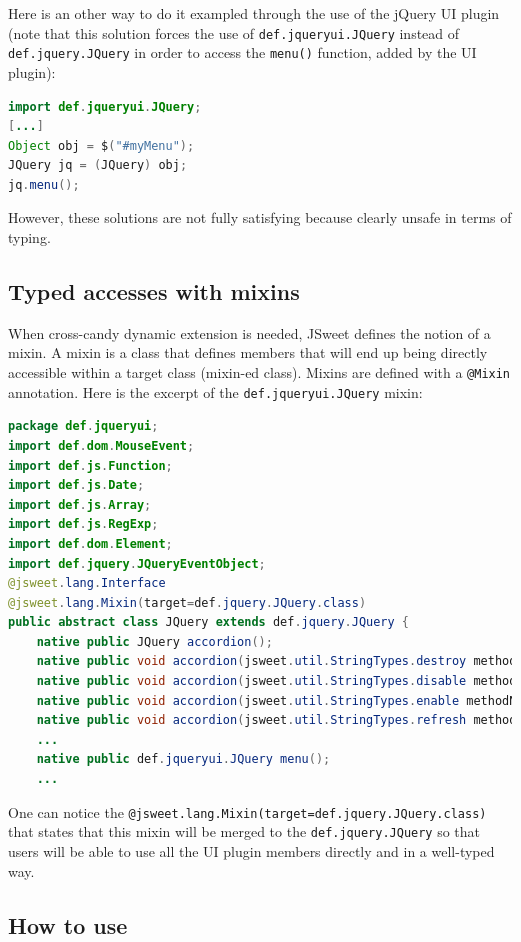 \documentclass[a4paper]{report}
\begin{document}
Here is an other way to do it exampled through the use of the jQuery UI plugin (note that this solution forces the use of \texttt{def.jqueryui.JQuery} instead of \texttt{def.jquery.JQuery} in order to access the \texttt{menu()} function, added by the UI plugin):

\begin{lstlisting}[language=Java]
import def.jqueryui.JQuery;
[...]
Object obj = $("#myMenu");
JQuery jq = (JQuery) obj;
jq.menu();
\end{lstlisting}

However, these solutions are not fully satisfying because clearly unsafe in terms of typing.

\subsection{Typed accesses with mixins}

When cross-candy dynamic extension is needed, JSweet defines the notion of a mixin. A mixin is a class that defines members that will end up being directly accessible within a target class (mixin-ed class). Mixins are defined with a \texttt{@Mixin} annotation. Here is the excerpt of the \texttt{def.jqueryui.JQuery} mixin:

\begin{lstlisting}[language=Java]
package def.jqueryui;
import def.dom.MouseEvent;
import def.js.Function;
import def.js.Date;
import def.js.Array;
import def.js.RegExp;
import def.dom.Element;
import def.jquery.JQueryEventObject;
@jsweet.lang.Interface
@jsweet.lang.Mixin(target=def.jquery.JQuery.class)
public abstract class JQuery extends def.jquery.JQuery {
    native public JQuery accordion();
    native public void accordion(jsweet.util.StringTypes.destroy methodName);
    native public void accordion(jsweet.util.StringTypes.disable methodName);
    native public void accordion(jsweet.util.StringTypes.enable methodName);
    native public void accordion(jsweet.util.StringTypes.refresh methodName);
    ...
    native public def.jqueryui.JQuery menu();
    ...
\end{lstlisting}

One can notice the \texttt{@jsweet.lang.Mixin(target=def.jquery.JQuery.class)} that states that this mixin will be merged to the \texttt{def.jquery.JQuery} so that users will be able to use all the UI plugin members directly and in a well-typed way.

\subsection{How to use}
\end{document}
